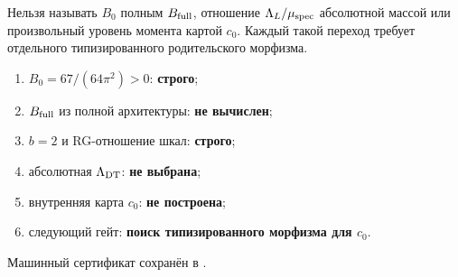 \begin{nogocriterion}
Нельзя называть $B_0$ полным $B_{\rm full}$, отношение
$\Lambda_L/\mu_{\rm spec}$ абсолютной массой или произвольный уровень
момента картой $c_0$. Каждый такой переход требует отдельного типизированного
родительского морфизма.
\end{nogocriterion}

\begin{protocol}\begin{enumerate}
\item $B_0=67/(64\pi^2)>0$: \textbf{строго};
\item $B_{\rm full}$ из полной архитектуры: \textbf{не вычислен};
\item $b=2$ и RG-отношение шкал: \textbf{строго};
\item абсолютная $\Lambda_{\rm DT}$: \textbf{не выбрана};
\item внутренняя карта $c_0$: \textbf{не построена};
\item следующий гейт: \textbf{поиск типизированного морфизма для $c_0$}.
\end{enumerate}\end{protocol}

Машинный сертификат сохранён в
.